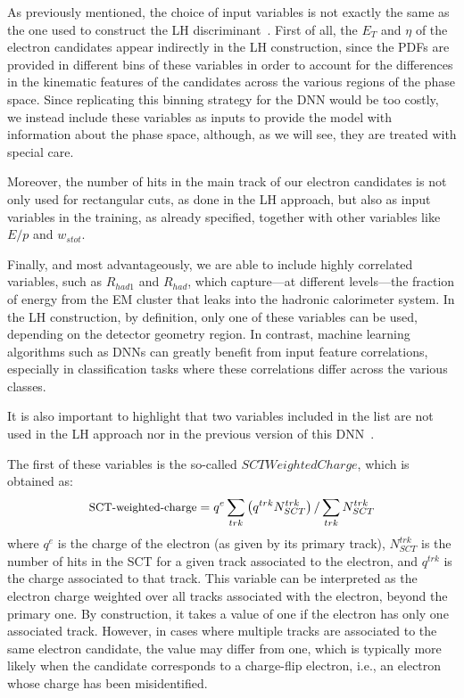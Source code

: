 As previously mentioned, the choice of input variables is not exactly the same as the one used to construct the LH discriminant~\cite{Aaboud:2657964}. First of all, the $E_{T}$ and $\eta$ of the electron candidates appear indirectly in the LH construction, since the PDFs are provided in different bins of these variables in order to account for the differences in the kinematic features of the candidates across the various regions of the phase space. Since replicating this binning strategy for the DNN would be too costly, we instead include these variables as inputs to provide the model with information about the phase space, although, as we will see, they are treated with special care.

Moreover, the number of hits in the main track of our electron candidates is not only used for rectangular cuts, as done in the LH approach, but also as input variables in the training, as already specified, together with other variables like $E/p$ and $w_{stot}$. 

Finally, and most advantageously, we are able to include highly correlated variables, such as $R_{had1}$ and $R_{had}$, which capture—at different levels—the fraction of energy from the EM cluster that leaks into the hadronic calorimeter system. In the LH construction, by definition, only one of these variables can be used, depending on the detector geometry region. In contrast, machine learning algorithms such as DNNs can greatly benefit from input feature correlations, especially in classification tasks where these correlations differ across the various classes.

It is also important to highlight that two variables included in the list are not used in the LH approach nor in the previous version of this DNN~\cite{dnn_paper}. 

The first of these variables is the so-called $SCTWeightedCharge$, which is obtained as:
\begin{equation}
  \small{\text{SCT-weighted-charge}} = q^{e}\sum_{trk}\left( q^{trk}N^{trk}_{SCT} \right)/\sum_{trk} N^{trk}_{SCT}
\end{equation}
where $q^{e}$ is the charge of the electron (as given by its primary track), $N^{trk}_{SCT}$ is the number of hits in the SCT for a given track associated to the electron, and $q^{trk}$ is the charge associated to that track. This variable can be interpreted as the electron charge weighted over all tracks associated with the electron, beyond the primary one. By construction, it takes a value of one if the electron has only one associated track. However, in cases where multiple tracks are associated to the same electron candidate, the value may differ from one, which is typically more likely when the candidate corresponds to a charge-flip electron, i.e., an electron whose charge has been misidentified.

